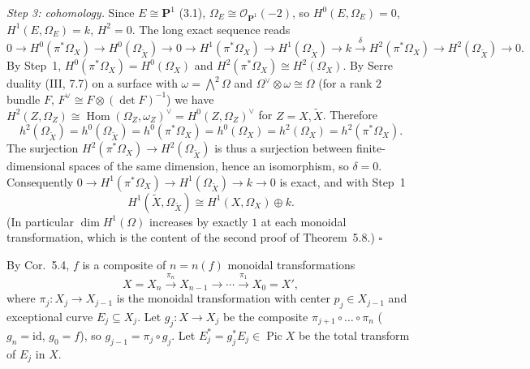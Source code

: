 \documentclass[11pt]{article}
\begin{document}
\emph{Step 3: cohomology.} Since $E\cong\mathbf P^1$ (3.1), $\Omega_E\cong\mathcal O_{\mathbf P^1}(-2)$, so $H^0(E,\Omega_E)=0$, $H^1(E,\Omega_E)=k$, $H^2=0$. The long exact sequence reads
\[
0\to H^0(\pi^*\Omega_X)\to H^0(\Omega_{\widetilde X})\to 0\to H^1(\pi^*\Omega_X)\to H^1(\Omega_{\widetilde X})\to k\xrightarrow{\ \delta\ } H^2(\pi^*\Omega_X)\to H^2(\Omega_{\widetilde X})\to0 .
\]
By Step~1, $H^0(\pi^*\Omega_X)=H^0(\Omega_X)$ and $H^2(\pi^*\Omega_X)\cong H^2(\Omega_X)$. By Serre duality (III, 7.7) on a surface with $\omega=\bigwedge^2\Omega$ and $\Omega^\vee\otimes\omega\cong\Omega$ (for a rank $2$ bundle $F$, $F^\vee\cong F\otimes(\det F)^{-1}$) we have $H^2(Z,\Omega_Z)\cong\operatorname{Hom}(\Omega_Z,\omega_Z)^\vee=H^0(Z,\Omega_Z)^\vee$ for $Z=X,\widetilde X$. Therefore
\[
h^2(\Omega_{\widetilde X})=h^0(\Omega_{\widetilde X})=h^0(\pi^*\Omega_X)=h^0(\Omega_X)=h^2(\Omega_X)=h^2(\pi^*\Omega_X).
\]
The surjection $H^2(\pi^*\Omega_X)\to H^2(\Omega_{\widetilde X})$ is thus a surjection between finite-dimensional spaces of the same dimension, hence an isomorphism, so $\delta=0$. Consequently $0\to H^1(\pi^*\Omega_X)\to H^1(\Omega_{\widetilde X})\to k\to0$ is exact, and with Step~1
\[
H^1(\widetilde X,\Omega_{\widetilde X})\cong H^1(X,\Omega_X)\oplus k.
\]
(In particular $\dim H^1(\Omega)$ increases by exactly $1$ at each monoidal transformation, which is the content of the second proof of Theorem~5.8.) \hfill$\square$

\pf
By Cor.~5.4, $f$ is a composite of $n=n(f)$ monoidal transformations
\[
X=X_n\xrightarrow{\pi_n}X_{n-1}\to\cdots\xrightarrow{\pi_1}X_0=X',
\]
where $\pi_j:X_j\to X_{j-1}$ is the monoidal transformation with center $p_j\in X_{j-1}$ and exceptional curve $E_j\subseteq X_j$. Let $g_j:X\to X_j$ be the composite $\pi_{j+1}\circ\dots\circ\pi_n$ ($g_n=\mathrm{id}$, $g_0=f$), so $g_{j-1}=\pi_j\circ g_j$. Let $E_j^*=g_j^*E_j\in\operatorname{Pic}X$ be the total transform of $E_j$ in $X$.
\end{document}
